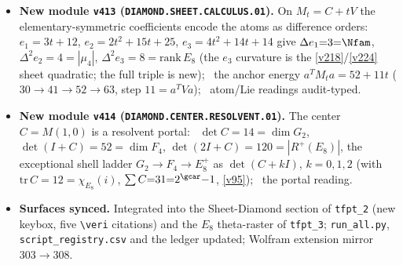 \begin{itemize}
$\det(I{+}J){=}12{=}\dim\mathfrak g_{\mathrm{SM}}$ and $\det(2I{+}J){=}40{=}|R(D_5)|$; \mC\ the Lie readings
audit-typed like the $G_2/F_4$ shadows.
\item \textbf{New module \texttt{v413} (\texttt{DIAMOND.SHEET.CALCULUS.01}).} On $M_t{=}C{+}tV$ the
elementary-symmetric coefficients encode the atoms as difference orders: $e_1{=}3t{+}12$, $e_2{=}2t^2{+}15t{+}25$,
$e_3{=}4t^2{+}14t{+}14$ give $\Delta e_1{=}3{=}\Nfam$, $\Delta^2 e_2{=}4{=}|\mu_4|$, $\Delta^2 e_3{=}8{=}\mathrm{rank}\,E_8$
(the $e_3$ curvature is the \vref{v218}/\vref{v224} sheet quadratic; the full triple is new); \mE\ the anchor energy
$a^TM_ta{=}52{+}11t$ ($30{\to}41{\to}52{\to}63$, step $11{=}a^TVa$); \mC\ atom/Lie readings audit-typed.
\item \textbf{New module \texttt{v414} (\texttt{DIAMOND.CENTER.RESOLVENT.01}).} The center $C{=}M(1,0)$ is a resolvent
portal: \mE\ $\det C{=}14{=}\dim G_2$, $\det(I{+}C){=}52{=}\dim F_4$, $\det(2I{+}C){=}120{=}|R^+(E_8)|$, the exceptional
shell ladder $G_2{\to}F_4{\to}E_8^+$ as $\det(C{+}kI)$, $k{=}0,1,2$ (with $\mathrm{tr}\,C{=}12{=}\chi_{E_8}(i)$,
$\sum C{=}31{=}2^{\gcar}{-}1$, \vref{v95}); \mC\ the portal reading.
\item \textbf{Surfaces synced.} Integrated into the Sheet-Diamond section of \texttt{tfpt\_2} (new keybox, five
\texttt{\textbackslash veri} citations) and the $E_8$ theta-raster of \texttt{tfpt\_3}; \texttt{run\_all.py},
\texttt{script\_registry.csv} and the ledger updated; Wolfram extension mirror $303\to308$.
\end{itemize}

